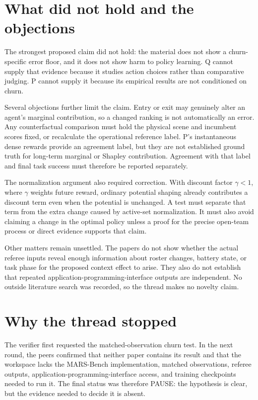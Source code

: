 \documentclass{article}
\begin{document}
\section{What did not hold and the objections}

The strongest proposed claim did not hold: the material does not show a churn-specific error floor, and it does not show harm to policy learning.  Q cannot supply that evidence because it studies action choices rather than comparative judging.  P cannot supply it because its empirical results are not conditioned on churn.

Several objections further limit the claim.  Entry or exit may genuinely alter an agent's marginal contribution, so a changed ranking is not automatically an error.  Any counterfactual comparison must hold the physical scene and incumbent scores fixed, or recalculate the operational reference label.  P's instantaneous dense rewards provide an agreement label, but they are not established ground truth for long-term marginal or Shapley contribution.  Agreement with that label and final task success must therefore be reported separately.

The normalization argument also required correction.  With discount factor \(\gamma<1\), where \(\gamma\) weights future reward, ordinary potential shaping already contributes a discount term even when the potential is unchanged.  A test must separate that term from the extra change caused by active-set normalization.  It must also avoid claiming a change in the optimal policy unless a proof for the precise open-team process or direct evidence supports that claim.

Other matters remain unsettled.  The papers do not show whether the actual referee inputs reveal enough information about roster changes, battery state, or task phase for the proposed context effect to arise.  They also do not establish that repeated application-programming-interface outputs are independent.  No outside literature search was recorded, so the thread makes no novelty claim.

\section{Why the thread stopped}

The verifier first requested the matched-observation churn test.  In the next round, the peers confirmed that neither paper contains its result and that the workspace lacks the MARS-Bench implementation, matched observations, referee outputs, application-programming-interface access, and training checkpoints needed to run it.  The final status was therefore PAUSE: the hypothesis is clear, but the evidence needed to decide it is absent.
\end{document}
